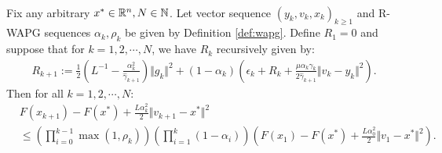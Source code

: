 \documentclass[12pt]{article}
\begin{document}
        \begin{proposition}\label{prop:wagp-convergence}\; \\
            Fix any arbitrary $x^* \in \mathbb R^n, N \in \mathbb N$. 
            Let vector sequence $(y_k, v_{k}, x_{k})_{k \ge 1}$ and R-WAPG sequences $\alpha_k, \rho_k$ be given by Definition \ref{def:wapg}. 
            Define $R_1 = 0$ and suppose that for $k = 1, 2, \cdots, N$, we have $R_k$ recursively given by: 
            \begin{align*}
                R_{k + 1}
                := 
                \frac{1}{2}\left(
                    L^{-1} - \frac{\alpha_k^2}{\hat \gamma_{k + 1}}
                \right)\Vert g_k\Vert^2
                + 
                (1 - \alpha_k)
                \left(
                    \epsilon_k + R_k + 
                    \frac{\mu\alpha_k\gamma_k}{2\hat \gamma_{k + 1}}
                    \Vert v_k - y_k\Vert^2
                \right). 
            \end{align*} 
            Then for all $k = 1, 2, \cdots, N$: 
            \begin{align*}
                & F(x_{k + 1}) - F(x^*) + \frac{L \alpha_k^2}{2}\Vert v_{k + 1} - x^*\Vert^2
                \\
                &\le 
                \left(
                    \prod_{i = 0}^{k - 1} \max(1, \rho_{k})
                \right)
                \left(
                    \prod_{i = 1}^{k} \left(1  - \alpha_i\right)
                \right)
                \left(
                    F(x_1) - F(x^*) + \frac{L\alpha_0^2}{2}\Vert v_1 - x^*\Vert^2
                \right). 
            \end{align*}
        \end{proposition}
        
\end{document}
